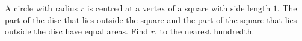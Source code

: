 A circle with radius $r$ is centred at a vertex of a square with side length $1$. The part of the disc that lies outside the square and the part of the square that lies outside the disc have equal areas. Find $r$, to the nearest hundredth.
